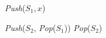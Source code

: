 % 
% 
% 
% 
\begin{frame}{}
  \centerline{}

  \begin{algorithm}[H]
    \begin{algorithmic}[]
	\State \textsl{Push}($S_1, x$)
      \EndProcedure

      \Statex
            \State \textsl{Push}($S_2$, \textsl{Pop}($S_1$))
          \EndWhile
        \EndIf
        \textsl{Pop}($S_2$)
      \EndProcedure
    \end{algorithmic}
  \end{algorithm}
\end{frame}

